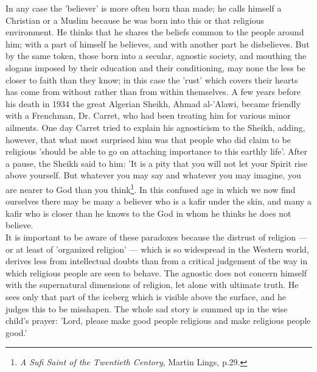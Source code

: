 \documentclass[11pt, b5paper, twoside]{book}
\begin{document}
In any case the 'believer' is more often born than made; he calls himself a Christian or a Muslim 
because he was born into this or that religious environment. He thinks that he shares the beliefs 
common to the people around him; with a part of himself he believes, and with another part he 
disbelieves. But by the same token, those born into a secular, agnostic society, and mouthing the 
slogans imposed by their education and their conditioning, may none the less be closer to faith than 
they know; in this case the 'rust' which covers their hearts has come from without rather than from 
within themselves. A few years before his death in 1934 the great Algerian Sheikh, Ahmad al-'Alawi, 
became friendly with a Frenchman, Dr. Carret, who had been treating him for various minor ailments. 
One day Carret tried to explain his agnosticism to the Sheikh, adding, however, that what most 
surprised him was that people who did claim to be religious 'should be able to go on attaching 
importance to this earthly life'. After a pause, the Sheikh said to him: 'It is a pity that you will 
not let your Spirit rise above yourself. But whatever you may say and whatever you may imagine, you 
are nearer to God than you think\footnote{\emph{A Sufi Saint of the Twentieth Centory}, Martin Lings, p.29.}. In this confused age in which we now find ourselves there may be many a believer who is a kafir under the skin, and many a kafir who is closer than he knows to the God in whom he thinks he does not believe. \\

It is important to be aware of these paradoxes because the distrust of religion --- or at least of 
'organized religion' --- which is so widespread in the Western world, derives less from intellectual 
doubts than from a critical judgement of the way in which religious people are seen to behave. The 
agnostic does not concern himself with the supernatural dimensions of religion, let alone with 
ultimate truth. He sees only that part of the iceberg which is visible above the surface, and he 
judges this to be misshapen. The whole sad story is summed up in the wise child's prayer: 'Lord, 
please make good people religious and make religious people good.' \\
\end{document}
